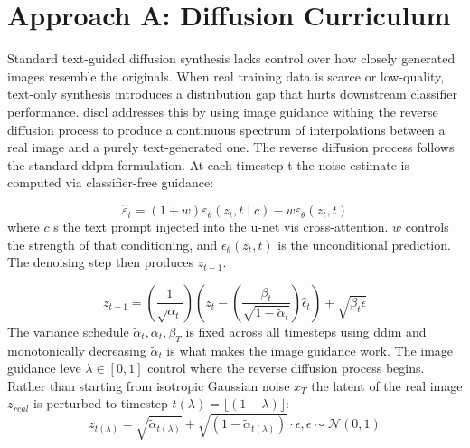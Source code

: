 \section{Approach A: Diffusion Curriculum}
Standard text-guided diffusion synthesis lacks control over how closely generated images resemble the originals. When real training data is scarce or low-quality, text-only synthesis 
introduces a distribution gap that hurts downstream classifier performance. \gls{discl}\cite{diffusion-curriculum} addresses this by using image guidance withing the reverse diffusion process to 
produce a continuous spectrum of interpolations between a real image and a purely text-generated one. 
The reverse diffusion process follows the standard \gls{ddpm} formulation. 
At each timestep t the noise estimate is computed via classifier-free guidance:

\begin{equation}
    \label{eq:cfg-noise}
    \hat{\varepsilon}_t = (1 + w) \varepsilon_\theta(z_t, t \mid c) - w \varepsilon_\theta(z_t, t)
\end{equation}
where $c$ s the text prompt injected into the \gls{u-net} vis cross-attention.
$w$ controls the strength of that conditioning, and $\epsilon_\theta(z_t, t)$ is the unconditional prediction. The denoising step then produces $z_{t-1}$. 

\begin{equation}
    \label{eq:denoising-step}
    z_{t-1}= (\frac{1}{\sqrt{\alpha_t}})(z_t - (\frac{\beta_t} {\sqrt{1 - \tilde{\alpha}_t}}) \hat{\epsilon}_t) + \sqrt{\beta_t \epsilon}
\end{equation}
The variance schedule $\tilde{\alpha}_t, \alpha_t, \beta_T$  is fixed across all timesteps using \gls{ddim} and monotonically decreasing $\tilde{\alpha}_t$ 
is what makes the image guidance work. The image guidance leve $\lambda \in [0,1]$ control where the reverse diffusion process begins. Rather than starting from \gls{isotropic Gaussian noise} $x_T$ 
the latent of the real image $z_{real}$ is perturbed to timestep $t(\lambda)=\lfloor (1 -\lambda)\rfloor$:
\begin{equation}
    \label{eq:image-guidance}
    z_{t(\lambda)} = \sqrt{\tilde{\alpha}_{t(\lambda)}} + \sqrt{(1 - \tilde{\alpha}_{t(\lambda)})}\cdot \epsilon, \epsilon \sim \mathcal{N}(0, 1)
\end{equation}

